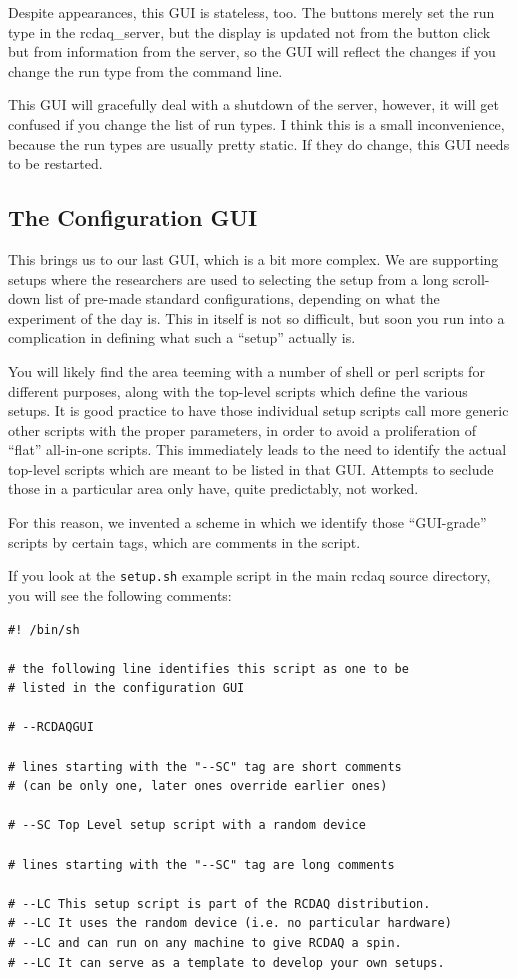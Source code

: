 \documentclass{article}[11pt]
\begin{document}
Despite appearances, this GUI is stateless, too. The buttons merely
set the run type in the rcdaq\_server, but the display is updated not
from the button click but from information from the server, so the GUI
will reflect the changes if you change the run type from the command line.

This GUI will gracefully deal with a shutdown of the server, however,
it will get confused if you change the list of run types. I think this
is a small inconvenience, because the run types are usually pretty
static. If they do change, this GUI needs to be restarted. 

\subsection{The Configuration GUI}

This brings us to our last GUI, which is a bit more complex. We are
supporting setups where the researchers are used to selecting the
setup from a long scroll-down list of pre-made standard
configurations, depending on what the experiment of the day is. This
in itself is not so difficult, but soon you run into a complication
in defining what such a ``setup'' actually is.

You will likely find the area teeming with a number of shell or perl
scripts for different purposes, along with the top-level scripts which
define the various setups.  It is good practice to have those
individual setup scripts call more generic other scripts with the
proper parameters, in order to avoid a proliferation of ``flat''
all-in-one scripts. This immediately leads to the need to identify the
actual top-level scripts which are meant to be listed in that
GUI. Attempts to seclude those in a particular area only have, quite
predictably, not worked.

For this reason, we invented a scheme in which we identify those
``GUI-grade'' scripts by certain tags, which are comments in the
script.

If you look at the \verb|setup.sh| example script in the main rcdaq
source directory, you will see the following comments:

\begin{verbatim}
#! /bin/sh

# the following line identifies this script as one to be
# listed in the configuration GUI

# --RCDAQGUI

# lines starting with the "--SC" tag are short comments
# (can be only one, later ones override earlier ones)

# --SC Top Level setup script with a random device

# lines starting with the "--SC" tag are long comments

# --LC This setup script is part of the RCDAQ distribution.
# --LC It uses the random device (i.e. no particular hardware)
# --LC and can run on any machine to give RCDAQ a spin.
# --LC It can serve as a template to develop your own setups. 
\end{verbatim}
\end{document}
